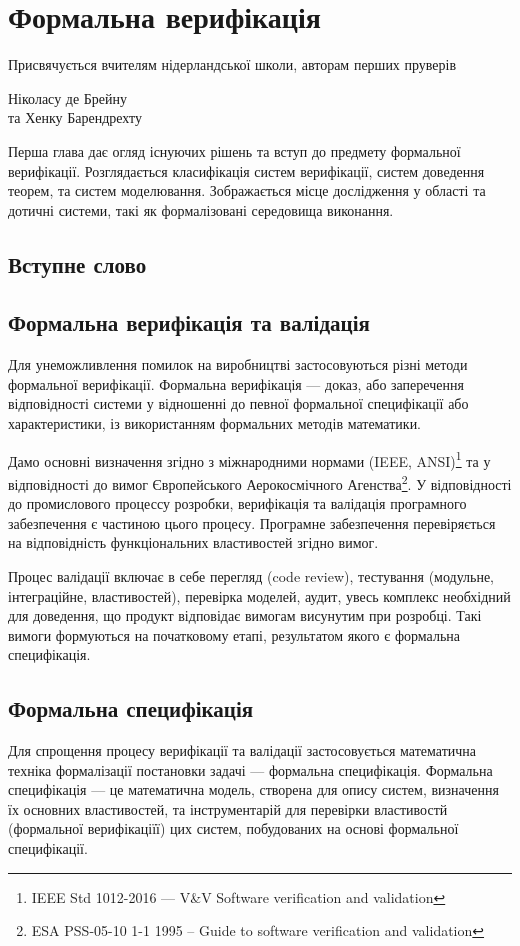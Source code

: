 \chapter{Формальна верифікація}
\epigraph{Присвячується вчителям нідерландської школи, авторам перших пруверів}{Ніколасу де Брейну \\ та Хенку Барендрехту}

Перша глава дає огляд існуючих рішень та вступ до предмету формальної верифікації.
Розглядається класифікація систем верифікації, систем доведення теорем, та систем
моделювання. Зображається місце дослідження у області та дотичні системи, такі як
формалізовані середовища виконання.

\section*{Вступне слово}

\section{Формальна верифікація та валідація}
Для унеможливлення помилок на виробництві застосовуються різні
методи формальної верифікації. Формальна верифікація — доказ, або заперечення
відповідності системи у відношенні до певної формальної специфікації або характеристики,
із використанням формальних методів математики.

Дамо основні визначення згідно з міжнародними нормами (IEEE, ANSI)\footnote{IEEE Std 1012-2016  --- V\&V Software verification and validation} та у відповідності до вимог
Європейського Аерокосмічного Агенства\footnote{ESA PSS-05-10 1-1 1995 -- Guide to software verification and validation}.
У відповідності до промислового процессу розробки, верифікація та валідація програмного
забезпечення є частиною цього процесу. Програмне забезпечення перевіряється на
відповідність функціональних властивостей згідно вимог.

Процес валідації включає в себе перегляд (code review),
тестування (модульне, інтеграційне, властивостей), перевірка моделей, аудит,
увесь комплекс необхідний для доведення, що продукт відповідає вимогам
висунутим при розробці. Такі вимоги формуються на початковому етапі,
результатом якого є формальна специфікація.

\newpage
\section{Формальна специфікація}
Для спрощення процесу верифікації та валідації
застосовується математична техніка формалізації постановки задачі --- формальна специфікація.
Формальна специфікація --- це математична модель, створена для опису систем,
визначення їх основних властивостей, та інструментарій для перевірки
властивостй (формальної верифікаціїї) цих систем, побудованих на основі формальної специфікації.

